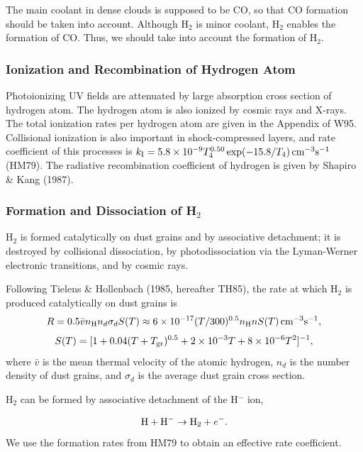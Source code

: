 The main coolant in dense clouds is supposed to be CO, 
so that CO formation should be taken into account. 
Although H$_2$ is minor coolant, H$_2$ enables the formation of CO.
Thus, we should take into account the formation of H$_2$. 

\subsubsection{Ionization and Recombination of Hydrogen Atom}
Photoionizing UV fields are attenuated by large absorption cross section of 
hydrogen atom.
The hydrogen atom is also ionized by cosmic rays and X-rays.
The total ionization rates per hydrogen atom are given 
in the Appendix of W95.
Collisional ionization is also important in shock-compressed layers,
and rate coefficient of this processes is 
$k_{\rm I}=5.8\times 10^{-9}T_4^{0.50}\exp(-15.8/T_4)\,
{\rm cm^{-3}s^{-1}}$(HM79).
The radiative recombination coefficient of hydrogen is given
by Shapiro \& Kang (1987).

\subsubsection{Formation and Dissociation of H$_2$}\label{Rpump}

H$_2$ is formed catalytically on dust grains
and by associative detachment; 
it is destroyed by collisional dissociation, 
by photodissociation via the Lyman-Werner electronic transitions,
and by cosmic rays. 

Following Tielens \& Hollenbach (1985, hereafter TH85), the rate at which
H$_2$ is produced catalytically on dust grains is
\begin{equation}
R=0.5\bar{v}n_{\rm H}n_d\sigma_dS(T)\approx
6\times10^{-17}(T/300)^{0.5}n_{\rm H}nS(T)\,{\rm cm^{-3}s^{-1}},
\end{equation}
\begin{equation}
S(T)=
[1+0.04(T+T_{\rm gr})^{0.5}+2\times 10^{-3}T+8\times 10^{-6}T^2]^{-1},
\end{equation}
where $\bar{v}$ is the mean thermal velocity of the atomic 
hydrogen, $n_d$ is the number density of dust grains, and
$\sigma_d$ is the average dust grain cross section.

H$_2$ can be formed by associative detachment of the 
H$^{-}$ ion,

\begin{equation}
{\rm H}+{\rm H}^{-}\to {\rm H_2}+e^{-}.
\end{equation}
We use the formation rates from HM79 to obtain an effective rate coefficient.

